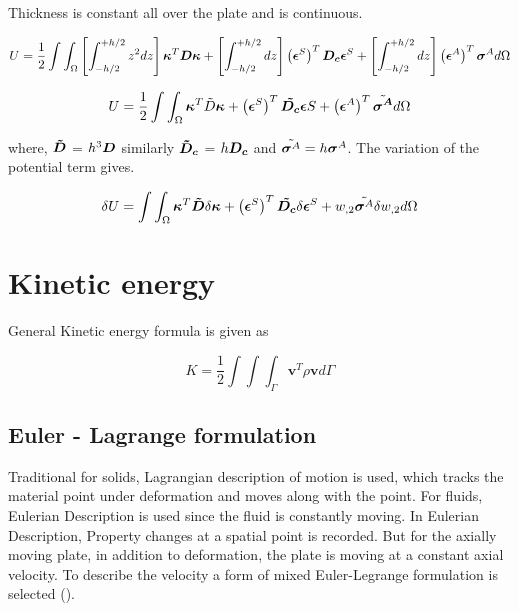 \documentclass[main.tex]{subfiles}
\begin{document}
Thickness is constant all over the plate and is continuous.

\begin{equation}
U=\frac{1}{2} \int\int_\Omega \left[ \int_{-h/2}^{+h/2} z^2 dz\right] \boldsymbol{\kappa}^T {\boldsymbol{D}} \boldsymbol{\kappa} 
+ \left[ \int_{-h/2}^{+h/2} dz\right]\left(\boldsymbol{\epsilon}^S\right)^T {\boldsymbol{D_c}} \boldsymbol{\epsilon}^S 
+ \left[ \int_{-h/2}^{+h/2} dz\right]
 \left(\boldsymbol{\epsilon}^A\right)^T \boldsymbol{\sigma}^A  d \Omega
\end{equation}


\begin{equation}
U=\frac{1}{2} \int\int_\Omega 
\boldsymbol{\kappa}^T \tilde{D} \boldsymbol{\kappa}
+ 
\left(\boldsymbol{\epsilon}^S\right)^T \boldsymbol{\tilde{D_c}} \boldsymbol{\epsilon}S 
+ 
 \left(\boldsymbol{\epsilon}^A\right)^T \tilde{\boldsymbol{\sigma^A}}  d \Omega
\end{equation}

where, $\boldsymbol{\tilde{D}}$ = $h^3\boldsymbol{D}$  similarly $\boldsymbol{\tilde{D}_c}$ = $h\boldsymbol{D_c}$ and $\tilde{\boldsymbol{\sigma}^A}=h\boldsymbol{\sigma}^A$. The variation of the potential term gives.


\begin{equation}\label{eq:vr_PE}
\delta U=\int\int_\Omega 
\boldsymbol{\kappa}^T \boldsymbol{\tilde{D}} \delta\boldsymbol{\kappa} 
+ 
\left(\boldsymbol{\epsilon}^S\right)^T \boldsymbol{\tilde{D_c}} \delta \boldsymbol{\epsilon}^S 
+ 
w_{,2}\tilde{\boldsymbol{\sigma}^A} \delta w_{,2} d \Omega
\end{equation}



\section{Kinetic energy}
General Kinetic energy formula is given as

\begin{equation}\label{eq:KE}
K = \frac{1}{2} \int \int \int_{\Gamma} \mathbf{v}^T\rho\mathbf{v} d\Gamma
\end{equation}


\subsection{Euler - Lagrange formulation}


Traditional for solids, Lagrangian description of motion is used, which tracks the material point under deformation and moves along with the point. For fluids, Eulerian Description is used since the fluid is constantly moving. In Eulerian Description, Property changes at a spatial point is recorded. But for the axially moving plate, in addition to deformation, the plate is moving at a constant axial velocity. To describe the velocity a form of mixed Euler-Legrange formulation is selected (\cite{Moving_beam}).
\end{document}

